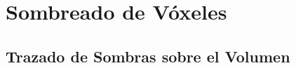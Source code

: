 \section{Sombreado de Vóxeles} %
\label{sec:sombreado_de_voxeles}


\subsection{Trazado de Sombras sobre el Volumen} %
\label{sub:trazado_de_sombras_sobre_el_volumen}


